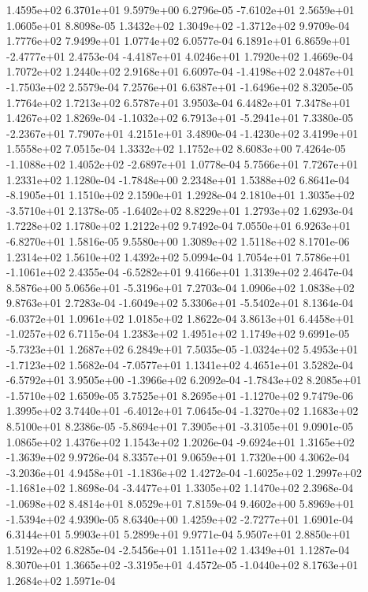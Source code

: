 1.4595e+02 6.3701e+01 9.5979e+00  6.2796e-05
-7.6102e+01  2.5659e+01  1.0605e+01  8.8098e-05
 1.3432e+02  1.3049e+02 -1.3712e+02  9.9709e-04
1.7776e+02 7.9499e+01 1.0774e+02  6.0577e-04
 6.1891e+01  6.8659e+01 -2.4777e+01  2.4753e-04
-4.4187e+01  4.0246e+01  1.7920e+02  1.4669e-04
1.7072e+02 1.2440e+02 2.9168e+01  6.6097e-04
-1.4198e+02  2.0487e+01 -1.7503e+02  2.5579e-04
 7.2576e+01  6.6387e+01 -1.6496e+02  8.3205e-05
1.7764e+02 1.7213e+02 6.5787e+01  3.9503e-04
6.4482e+01 7.3478e+01 1.4267e+02  1.8269e-04
-1.1032e+02  6.7913e+01 -5.2941e+01  7.3380e-05
-2.2367e+01  7.7907e+01  4.2151e+01  3.4890e-04
-1.4230e+02  3.4199e+01  1.5558e+02  7.0515e-04
1.3332e+02 1.1752e+02 8.6083e+00  7.4264e-05
-1.1088e+02  1.4052e+02 -2.6897e+01  1.0778e-04
5.7566e+01 7.7267e+01 1.2331e+02  1.1280e-04
-1.7848e+00  2.2348e+01  1.5388e+02  6.8641e-04
-8.1905e+01  1.1510e+02  2.1590e+01  1.2928e-04
 2.1810e+01  1.3035e+02 -3.5710e+01  2.1378e-05
-1.6402e+02  8.8229e+01  1.2793e+02  1.6293e-04
1.7228e+02 1.1780e+02 1.2122e+02  9.7492e-04
 7.0550e+01  6.9263e+01 -6.8270e+01  1.5816e-05
9.5580e+00 1.3089e+02 1.5118e+02  8.1701e-06
1.2314e+02 1.5610e+02 1.4392e+02  5.0994e-04
 1.7054e+01  7.5786e+01 -1.1061e+02  2.4355e-04
-6.5282e+01  9.4166e+01  1.3139e+02  2.4647e-04
 8.5876e+00  5.0656e+01 -5.3196e+01  7.2703e-04
1.0906e+02 1.0838e+02 9.8763e+01  2.7283e-04
-1.6049e+02  5.3306e+01 -5.5402e+01  8.1364e-04
-6.0372e+01  1.0961e+02  1.0185e+02  1.8622e-04
 3.8613e+01  6.4458e+01 -1.0257e+02  6.7115e-04
1.2383e+02 1.4951e+02 1.1749e+02  9.6991e-05
-5.7323e+01  1.2687e+02  6.2849e+01  7.5035e-05
-1.0324e+02  5.4953e+01 -1.7123e+02  1.5682e-04
-7.0577e+01  1.1341e+02  4.4651e+01  3.5282e-04
-6.5792e+01  3.9505e+00 -1.3966e+02  6.2092e-04
-1.7843e+02  8.2085e+01 -1.5710e+02  1.6509e-05
 3.7525e+01  8.2695e+01 -1.1270e+02  9.7479e-06
 1.3995e+02  3.7440e+01 -6.4012e+01  7.0645e-04
-1.3270e+02  1.1683e+02  8.5100e+01  8.2386e-05
-5.8694e+01  7.3905e+01 -3.3105e+01  9.0901e-05
1.0865e+02 1.4376e+02 1.1543e+02  1.2026e-04
-9.6924e+01  1.3165e+02 -1.3639e+02  9.9726e-04
8.3357e+01 9.0659e+01 1.7320e+00  4.3062e-04
-3.2036e+01  4.9458e+01 -1.1836e+02  1.4272e-04
-1.6025e+02  1.2997e+02 -1.1681e+02  1.8698e-04
-3.4477e+01  1.3305e+02  1.1470e+02  2.3968e-04
-1.0698e+02  8.4814e+01  8.0529e+01  7.8159e-04
 9.4602e+00  5.8969e+01 -1.5394e+02  4.9390e-05
 8.6340e+00  1.4259e+02 -2.7277e+01  1.6901e-04
6.3144e+01 5.9903e+01 5.2899e+01  9.9771e-04
5.9507e+01 2.8850e+01 1.5192e+02  6.8285e-04
-2.5456e+01  1.1511e+02  1.4349e+01  1.1287e-04
 8.3070e+01  1.3665e+02 -3.3195e+01  4.4572e-05
-1.0440e+02  8.1763e+01  1.2684e+02  1.5971e-04
